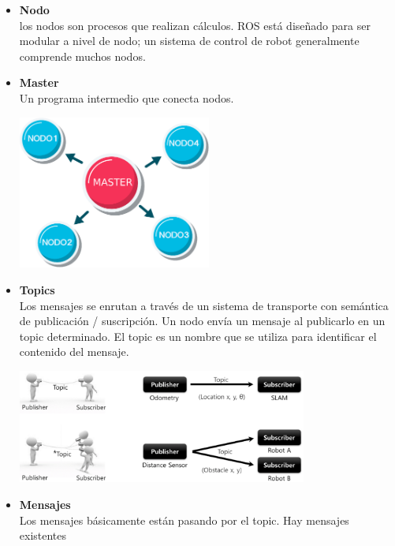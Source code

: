 \begin{itemize}
	\item \textbf{Nodo}\\
	      los nodos son procesos que realizan cálculos. ROS está diseñado para ser modular
	      a nivel de nodo; un sistema de control de robot generalmente comprende muchos nodos.
	\item \textbf{Master}\\
	      Un programa intermedio que conecta nodos.
	      \begin{center}
		      \includegraphics[width=0.5\textwidth]{Contenido/Cuerpo/Capitulo2/Fig2.eps}
		      \label{fig:MarcoTeorico:Fig14}
	      \end{center}
	\item \textbf{Topics}\\
	      Los mensajes se enrutan a través de un sistema de transporte con semántica de
	      publicación / suscripción. Un nodo envía un mensaje al publicarlo en un topic
	      determinado. El topic es un nombre que se utiliza para identificar el contenido del
	      mensaje.
	      \begin{center}
		      \includegraphics[width=0.75\textwidth]{Contenido/Cuerpo/Capitulo2/Fig3.eps}
		      \label{fig:MarcoTeorico:Fig15}
	      \end{center}
	\item \textbf{Mensajes}\\
	      Los mensajes básicamente están pasando por el topic. Hay mensajes existentes

\end{itemize}
